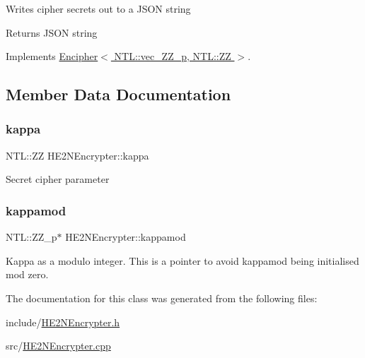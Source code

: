Writes cipher secrets out to a J\+S\+ON string \begin{DoxyReturn}{Returns}
J\+S\+ON string 
\end{DoxyReturn}


Implements \hyperlink{classEncipher_a27d3efa1e364c1f0d7def65454c61b85}{Encipher$<$ N\+T\+L\+::vec\+\_\+\+Z\+Z\+\_\+p, N\+T\+L\+::\+Z\+Z $>$}.



\subsection{Member Data Documentation}
\mbox{\label{classHE2NEncrypter_afd61d38d86bd894ba9e0b4f0bc6265b2}} 
\subsubsection{\texorpdfstring{kappa}{kappa}}
{\footnotesize\ttfamily N\+T\+L\+::\+ZZ H\+E2\+N\+Encrypter\+::kappa\hspace{0.3cm}{\ttfamily [private]}}

Secret cipher parameter \mbox{\label{classHE2NEncrypter_ae13c7d0f1d11f2177f7183c50d0614a7}} 
\subsubsection{\texorpdfstring{kappamod}{kappamod}}
{\footnotesize\ttfamily N\+T\+L\+::\+Z\+Z\+\_\+p$\ast$ H\+E2\+N\+Encrypter\+::kappamod\hspace{0.3cm}{\ttfamily [private]}}

Kappa as a modulo integer. This is a pointer to avoid kappamod being initialised mod zero. 

The documentation for this class was generated from the following files\+:\begin{DoxyCompactItemize}
\item 
include/\hyperlink{HE2NEncrypter_8h}{H\+E2\+N\+Encrypter.\+h}\item 
src/\hyperlink{HE2NEncrypter_8cpp}{H\+E2\+N\+Encrypter.\+cpp}\end{DoxyCompactItemize}
